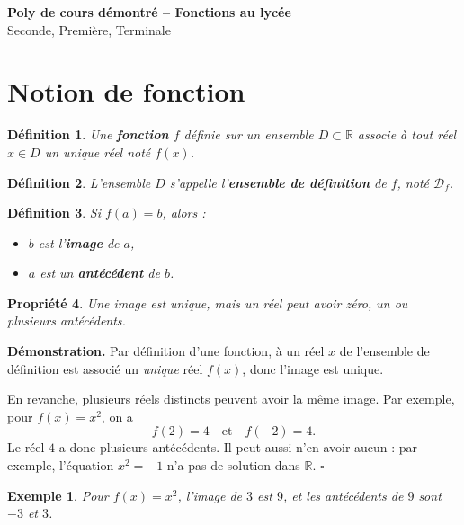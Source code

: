 \documentclass[11pt,a4paper]{article}
\newtheorem{definition}{Définition}[section]
\newtheorem{propriete}[definition]{Propriété}
\newtheorem*{exemple}{Exemple}
\newcommand{\R}{\mathbb{R}}
\newcommand{\D}{\mathcal{D}}
\begin{document}
\begin{center}
{\LARGE \textbf{Poly de cours démontré -- Fonctions au lycée}}\\[0.5em]
{\large Seconde, Première, Terminale}\\[0.5em]
\end{center}

\tableofcontents
\newpage

\section{Notion de fonction}

\begin{definition}
Une \textbf{fonction} \(f\) définie sur un ensemble \(D \subset \R\) associe à tout réel \(x \in D\) un unique réel noté \(f(x)\).
\end{definition}

\begin{definition}
L'ensemble \(D\) s'appelle l'\textbf{ensemble de définition} de \(f\), noté \(\D_f\).
\end{definition}

\begin{definition}
Si \(f(a)=b\), alors :
\begin{itemize}
    \item \(b\) est l'\textbf{image} de \(a\),
    \item \(a\) est un \textbf{antécédent} de \(b\).
\end{itemize}
\end{definition}

\begin{propriete}
Une image est unique, mais un réel peut avoir zéro, un ou plusieurs antécédents.
\end{propriete}

\textbf{Démonstration.}  
Par définition d'une fonction, à un réel \(x\) de l'ensemble de définition est associé un \emph{unique} réel \(f(x)\), donc l'image est unique.

En revanche, plusieurs réels distincts peuvent avoir la même image. Par exemple, pour \(f(x)=x^2\), on a
\[
f(2)=4 \quad \text{et} \quad f(-2)=4.
\]
Le réel \(4\) a donc plusieurs antécédents. Il peut aussi n'en avoir aucun : par exemple, l'équation \(x^2=-1\) n'a pas de solution dans \(\R\). \(\square\)

\begin{exemple}
Pour \(f(x)=x^2\), l'image de \(3\) est \(9\), et les antécédents de \(9\) sont \(-3\) et \(3\).
\end{exemple}
\end{document}
